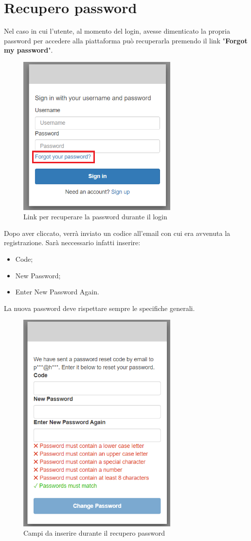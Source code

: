 \section{Recupero password} {
    Nel caso in cui l'utente, al momento del login, avesse dimenticato la propria password per accedere alla piattaforma 
    \platform può recuperarla premendo il link "\textbf{Forgot my password}". 
    \begin{figure}[H]
        \includegraphics[width=8cm]{sezioni/images/psw-forgot.png}
        \centering
        \caption{Link per recuperare la password durante il login}
    \end{figure}

    Dopo aver cliccato, verrà inviato un codice all'email con cui era avvenuta la registrazione. Sarà neccessario infatti inserire: 
    \begin{itemize}
        \item Code;
        \item New Password;
        \item Enter New Password Again.
    \end{itemize} 
    La nuova password deve rispettare sempre le specifiche generali.
    \begin{figure}[H]
        \includegraphics[width=8cm]{sezioni/images/rec-psw.png}
        \centering
        \caption{Campi da inserire durante il recupero password}
    \end{figure}
}
